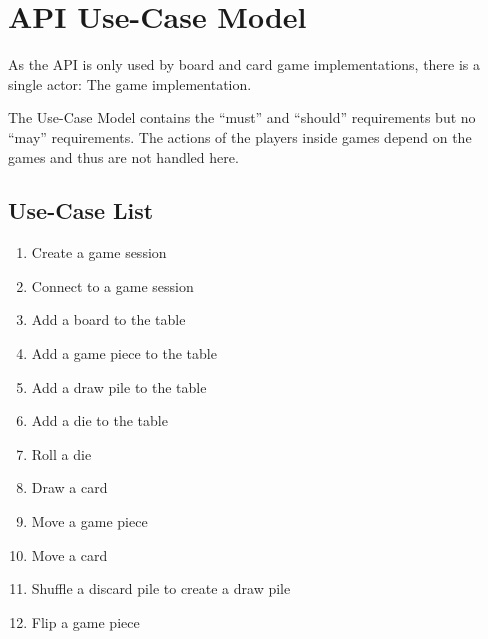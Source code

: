 \section{API Use-Case Model}

As the API is only used by board and card game implementations, there is a
single actor: The game implementation.

The Use-Case Model contains the “must” and “should” requirements but no “may”
requirements. The actions of the players inside games depend on the games and
thus are not handled here.

\subsection{Use-Case List}

\begin{enumerate}
  \item Create a game session
  \item Connect to a game session
  \item Add a board to the table
  \item Add a game piece to the table
  \item Add a \gls{draw pile} to the table
  \item Add a \gls{die} to the table
  \item Roll a \gls{die}
  \item Draw a card
  \item Move a game piece
  \item Move a card
  \item Shuffle a \gls{discard pile} to create a \gls{draw pile}
  \item Flip a game piece
\end{enumerate}
